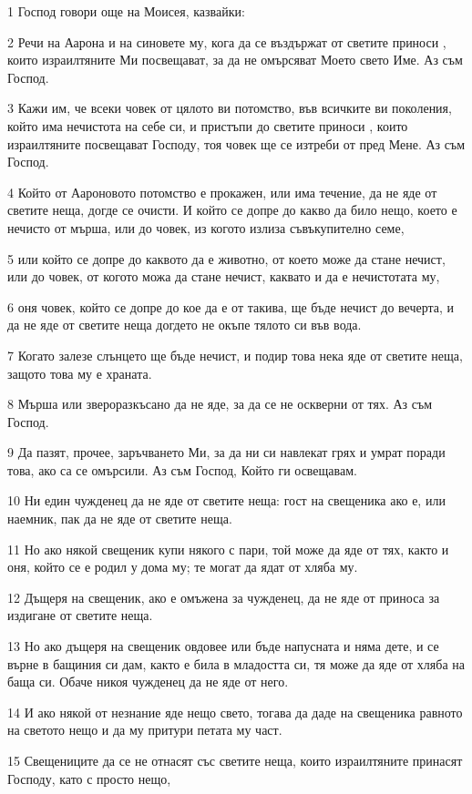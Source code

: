\par 1 Господ говори още на Моисея, казвайки:
\par 2 Речи на Аарона и на синовете му, кога да се въздържат от светите приноси , които израилтяните Ми посвещават, за да не омърсяват Моето свето Име. Аз съм Господ.
\par 3 Кажи им, че всеки човек от цялото ви потомство, във всичките ви поколения, който има нечистота на себе си, и пристъпи до светите приноси , които израилтяните посвещават Господу, тоя човек ще се изтреби от пред Мене. Аз съм Господ.
\par 4 Който от Аароновото потомство е прокажен, или има течение, да не яде от светите неща, догде се очисти. И който се допре до какво да било нещо, което е нечисто от мърша, или до човек, из когото излиза съвъкупително семе,
\par 5 или който се допре до каквото да е животно, от което може да стане нечист, или до човек, от когото можа да стане нечист, каквато и да е нечистотата му,
\par 6 оня човек, който се допре до кое да е от такива, ще бъде нечист до вечерта, и да не яде от светите неща догдето не окъпе тялото си във вода.
\par 7 Когато залезе слънцето ще бъде нечист, и подир това нека яде от светите неща, защото това му е храната.
\par 8 Мърша или звероразкъсано да не яде, за да се не оскверни от тях. Аз съм Господ.
\par 9 Да пазят, прочее, заръчването Ми, за да ни си навлекат грях и умрат поради това, ако са се омърсили. Аз съм Господ, Който ги освещавам.
\par 10 Ни един чужденец да не яде от светите неща: гост на свещеника ако е, или наемник, пак да не яде от светите неща.
\par 11 Но ако някой свещеник купи някого с пари, той може да яде от тях, както и оня, който се е родил у дома му; те могат да ядат от хляба му.
\par 12 Дъщеря на свещеник, ако е омъжена за чужденец, да не яде от приноса за издигане от светите неща.
\par 13 Но ако дъщеря на свещеник овдовее или бъде напусната и няма дете, и се върне в бащиния си дам, както е била в младостта си, тя може да яде от хляба на баща си. Обаче никоя чужденец да не яде от него.
\par 14 И ако някой от незнание яде нещо свето, тогава да даде на свещеника равното на светото нещо и да му притури петата му част.
\par 15 Свещениците да се не отнасят със светите неща, които израилтяните принасят Господу, като с просто нещо,
